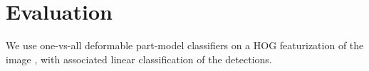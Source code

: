 \section{Evaluation} \label{sec:evaluation}

We use one-vs-all deformable part-model classifiers on a HOG featurization of the image \cite{Felzenszwalb2010a}, with associated linear classification of the detections.

\begin{figure}[h!]
\centering
{} \hfill
{}
\end{figure}

